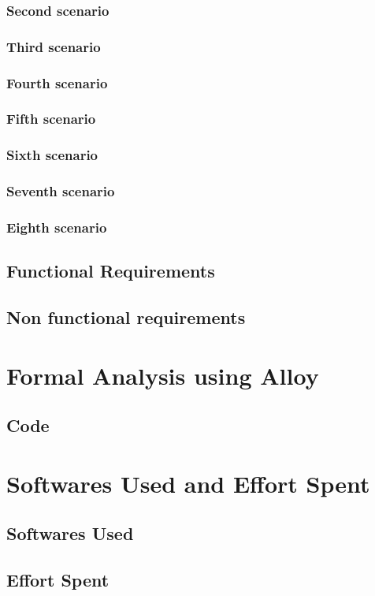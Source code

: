 \documentclass[12pt]{article}
\begin{document}
	\subsubsection{Second scenario}
	
	\FloatBarrier
	\clearpage
	\subsubsection{Third scenario}
	
	\FloatBarrier
	\clearpage
	\subsubsection{Fourth scenario}
	
	\FloatBarrier
	\clearpage
	\subsubsection{Fifth scenario}
	
	\FloatBarrier
	\clearpage
	\subsubsection{Sixth scenario}
	
	\FloatBarrier
	\clearpage
	\subsubsection{Seventh scenario}
	
	\FloatBarrier
	\clearpage
	\subsubsection{Eighth scenario}
	
	\FloatBarrier
	\clearpage
	\subsection{Functional Requirements}
	
	\subsection{Non functional requirements}
	

	\clearpage
	\section{Formal Analysis using Alloy}
	
	\subsection{Code}
	
	
	\clearpage
	\section{Softwares Used and Effort Spent}
	\subsection{Softwares Used}
	
	\subsection{Effort Spent}
	
\end{document}
